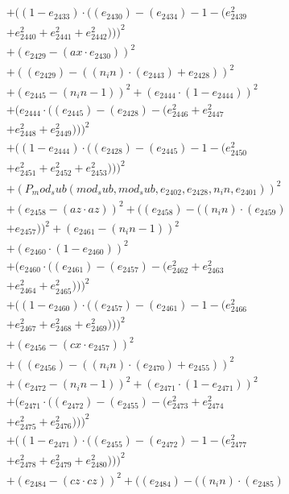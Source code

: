 \documentclass[10pt, a4paper]{article}
\begin{document}
\begin{small}
\begin{align*}
& + ((1 - e_{2433})  \cdot  ((e_{2430}) - (e_{2434}) - 1 - (e_{2439}^{2} \\
& + e_{2440}^{2} + e_{2441}^{2} + e_{2442}^{2})))^{2} \\
& + (e_{2429} - (ax  \cdot  e_{2430}))^{2} \\
& + ((e_{2429}) - ((n_in)  \cdot  (e_{2443}) + e_{2428}))^{2} \\
& + (e_{2445} - (n_in - 1))^{2} + (e_{2444}  \cdot  (1 - e_{2444}))^{2} \\
& + (e_{2444}  \cdot  ((e_{2445}) - (e_{2428}) - (e_{2446}^{2} + e_{2447}^{2} \\
& + e_{2448}^{2} + e_{2449}^{2})))^{2} \\
& + ((1 - e_{2444})  \cdot  ((e_{2428}) - (e_{2445}) - 1 - (e_{2450}^{2} \\
& + e_{2451}^{2} + e_{2452}^{2} + e_{2453}^{2})))^{2} \\
& + (P_mod_sub(mod_sub, mod_sub, e_{2402}, e_{2428}, n_in, e_{2401}))^{2} \\
& + (e_{2458} - (az  \cdot  az))^{2} + ((e_{2458}) - ((n_in)  \cdot  (e_{2459}) \\
& + e_{2457}))^{2} + (e_{2461} - (n_in - 1))^{2} \\
& + (e_{2460}  \cdot  (1 - e_{2460}))^{2} \\
& + (e_{2460}  \cdot  ((e_{2461}) - (e_{2457}) - (e_{2462}^{2} + e_{2463}^{2} \\
& + e_{2464}^{2} + e_{2465}^{2})))^{2} \\
& + ((1 - e_{2460})  \cdot  ((e_{2457}) - (e_{2461}) - 1 - (e_{2466}^{2} \\
& + e_{2467}^{2} + e_{2468}^{2} + e_{2469}^{2})))^{2} \\
& + (e_{2456} - (cx  \cdot  e_{2457}))^{2} \\
& + ((e_{2456}) - ((n_in)  \cdot  (e_{2470}) + e_{2455}))^{2} \\
& + (e_{2472} - (n_in - 1))^{2} + (e_{2471}  \cdot  (1 - e_{2471}))^{2} \\
& + (e_{2471}  \cdot  ((e_{2472}) - (e_{2455}) - (e_{2473}^{2} + e_{2474}^{2} \\
& + e_{2475}^{2} + e_{2476}^{2})))^{2} \\
& + ((1 - e_{2471})  \cdot  ((e_{2455}) - (e_{2472}) - 1 - (e_{2477}^{2} \\
& + e_{2478}^{2} + e_{2479}^{2} + e_{2480}^{2})))^{2} \\
& + (e_{2484} - (cz  \cdot  cz))^{2} + ((e_{2484}) - ((n_in)  \cdot  (e_{2485}) \\

\end{align*}
\end{small}
\end{document}
